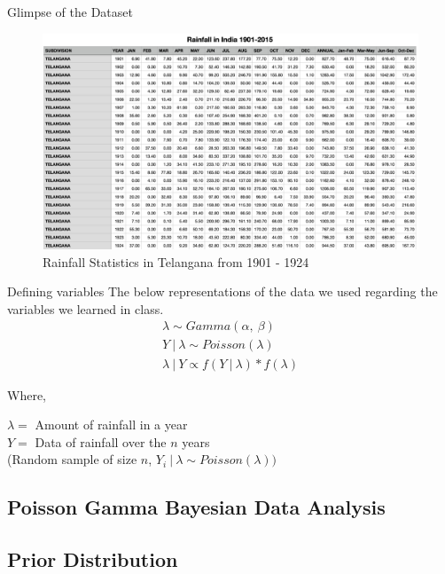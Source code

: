 \documentclass{beamer}
\begin{document}
\begin{frame}{Glimpse of the Dataset}
\begin{figure}[htp]
\includegraphics[width=1.05\textwidth]{Images/Glimpse.png}
\caption{Rainfall Statistics in Telangana from 1901 - 1924}
\end{figure}  
\end{frame}

\begin{frame}{Defining variables}
The below representations of the data we used regarding the variables we learned in class.
\begin{align}
    \lambda \sim Gamma(\alpha,\: \beta)\\
    Y \:| \:\lambda \sim Poisson(\lambda)\\
    \lambda \:|\: Y \propto f(Y\:|\:\lambda)* f(\lambda)
\end{align}

Where, \\
\begin{center}
$\lambda = $ Amount of rainfall in a year \\
$Y = $ Data of rainfall over the $n$ years\\
(Random sample of size $n$, $Y_i\:|\:\lambda \sim Poisson(\lambda))$
\end{center}
\end{frame}

\begin{frame}
\section{Poisson Gamma Bayesian Data Analysis}
\end{frame}

\begin{frame}
\section{Prior Distribution}
\end{frame}
\end{document}
